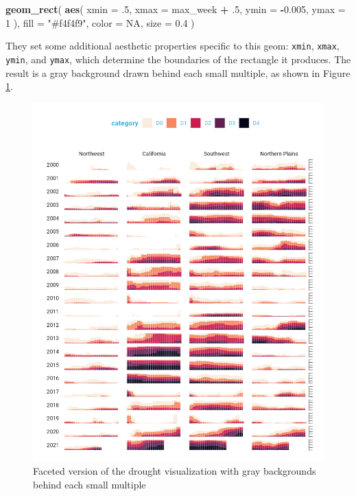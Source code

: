 \documentclass[
]{book}
\newenvironment{Shaded}{\begin{snugshade}}{\end{snugshade}}
\newcommand{\AttributeTok}[1]{\textcolor[rgb]{0.13,0.29,0.53}{#1}}
\newcommand{\ConstantTok}[1]{\textcolor[rgb]{0.56,0.35,0.01}{#1}}
\newcommand{\DecValTok}[1]{\textcolor[rgb]{0.00,0.00,0.81}{#1}}
\newcommand{\FloatTok}[1]{\textcolor[rgb]{0.00,0.00,0.81}{#1}}
\newcommand{\FunctionTok}[1]{\textcolor[rgb]{0.13,0.29,0.53}{\textbf{#1}}}
\newcommand{\NormalTok}[1]{#1}
\newcommand{\SpecialCharTok}[1]{\textcolor[rgb]{0.81,0.36,0.00}{\textbf{#1}}}
\newcommand{\StringTok}[1]{\textcolor[rgb]{0.31,0.60,0.02}{#1}}
\begin{document}
\begin{Shaded}
\begin{Highlighting}[]
\FunctionTok{geom\_rect}\NormalTok{(}
  \FunctionTok{aes}\NormalTok{(}
    \AttributeTok{xmin =}\NormalTok{ .}\DecValTok{5}\NormalTok{,}
    \AttributeTok{xmax =}\NormalTok{ max\_week }\SpecialCharTok{+}\NormalTok{ .}\DecValTok{5}\NormalTok{,}
    \AttributeTok{ymin =} \SpecialCharTok{{-}}\FloatTok{0.005}\NormalTok{,}
    \AttributeTok{ymax =} \DecValTok{1}
\NormalTok{  ),}
  \AttributeTok{fill =} \StringTok{"\#f4f4f9"}\NormalTok{,}
  \AttributeTok{color =} \ConstantTok{NA}\NormalTok{,}
  \AttributeTok{size =} \FloatTok{0.4}
\NormalTok{)}
\end{Highlighting}
\end{Shaded}

They set some additional aesthetic properties specific to this geom: \texttt{xmin}, \texttt{xmax}, \texttt{ymin}, and \texttt{ymax}, which determine the boundaries of the rectangle it produces. The result is a gray background drawn behind each small multiple, as shown in Figure \ref{fig:drought-viz-theme-tweaks-plot}.

\begin{figure}
\includegraphics[width=1\linewidth]{data-viz_files/figure-latex/drought-viz-theme-tweaks-plot-1} \caption{Faceted version of the drought visualization with gray backgrounds behind each small multiple}\label{fig:drought-viz-theme-tweaks-plot}
\end{figure}
\end{document}
